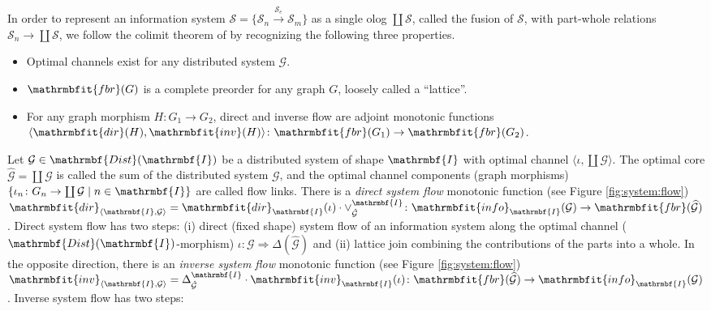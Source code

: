 \documentclass{amsart}
\def\to{\rightarrow}
\theoremstyle{remark}
\theoremstyle{definition}
\begin{document}
In order to represent an information system 
$\mathcal{S} = \{ \mathcal{S}_{n} \xrightarrow{\mathcal{S}_{e}} \mathcal{S}_{m} \}$
as a single olog $\coprod\mathcal{S}$, 
called the fusion of $\mathcal{S}$,
with part-whole relations $\mathcal{S}_{n} \rightarrow \coprod\mathcal{S}$,
we follow the colimit theorem of \cite{TBG:IC}
by recognizing the following three properties.
%
\begin{itemize}
%
\item 
Optimal channels exist for any distributed system $\mathcal{G}$.
%
\item 
$\mathrmbfit{fbr}(G)$ is a complete preorder for any graph $G$,
loosely called a ``lattice''.
%
\item 
For any graph morphism $H \colon G_{1} \rightarrow G_{2}$,
direct and inverse flow are adjoint monotonic functions
${\langle{\mathrmbfit{dir}(H),\mathrmbfit{inv}(H)}\rangle}
 \colon \mathrmbfit{fbr}(G_{1}) \rightarrow \mathrmbfit{fbr}(G_{2})$.
%
\end{itemize}
%
Let $\mathcal{G} \in \mathrmbf{Dist}(\mathrmbf{I})$ be a distributed system 
of shape $\mathrmbf{I}$
with optimal channel ${\langle{\iota,\coprod\mathcal{G}}\rangle}$.
The optimal core $\widehat{\mathcal{G}}=\coprod\mathcal{G}$ is called the sum of the distributed system $\mathcal{G}$,
and the optimal channel components (graph morphisms)
$\{ \iota_{n} \colon G_{n} \rightarrow \coprod\mathcal{G} \mid n \in \mathrmbf{I} \}$
are called flow links.
%
There is a {\em direct system flow} monotonic function (see Figure \ref{fig:system:flow})
$\mathrmbfit{dir}_{{\langle{\mathrmbf{I},\mathcal{G}}\rangle}}
= \mathrmbfit{dir}_{\mathrmbf{I}}(\iota) \cdot {\vee^{\mathrmbf{I}}_{\hat{\mathcal{G}}}} 
\colon \mathrmbfit{info}_{\mathrmbf{I}}(\mathcal{G}) \to \mathrmbfit{fbr}(\widehat{\mathcal{G}})$.
Direct system flow has two steps:
(i) direct (fixed shape) system flow of an information system along the optimal channel
($\mathrmbf{Dist}(\mathrmbf{I})$-morphism)
$\iota \colon \mathcal{G} \Rightarrow \Delta(\widehat{\mathcal{G}})$
and 
(ii) lattice join 
combining the contributions of the parts into a whole.
%
In the opposite direction,
there is an {\em inverse system flow} monotonic function (see Figure \ref{fig:system:flow})
$\mathrmbfit{inv}_{{\langle{\mathrmbf{I},\mathcal{G}}\rangle}}
= {\Delta^{\mathrmbf{I}}_{\hat{\mathcal{G}}}}  \cdot \mathrmbfit{inv}_{\mathrmbf{I}}(\iota)
\colon \mathrmbfit{fbr}(\widehat{\mathcal{G}}) \to \mathrmbfit{info}_{\mathrmbf{I}}(\mathcal{G})$.
Inverse system flow has two steps:
\end{document}
